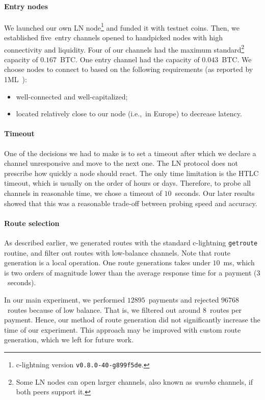 \paragraph{Entry nodes}
We launched our own LN node\footnote{c-lightning version \texttt{v0.8.0-40-g899f5de}.} and funded it with testnet coins.
Then, we established five~entry channels opened to handpicked nodes with high connectivity and liquidity.
Four of our channels had the maximum standard\footnote{Some LN nodes can open larger channels, also known as \textit{wumbo} channels, if both peers support it.} capacity of $0.167$~BTC.
One entry channel had the capacity of $0.043$~BTC.
We choose nodes to connect to based on the following requirements (as reported by 1ML~\cite{1MLTopConnected}):
\begin{itemize}
	\item well-connected and well-capitalized;
	\item located relatively close to our node (i.e.,~in Europe) to decrease latency.
\end{itemize}

\paragraph{Timeout}
One of the decisions we had to make is to set a timeout after which we declare a channel unresponsive and move to the next one.
The LN protocol does not prescribe how quickly a node should react.
The only time limitation is the HTLC timeout, which is usually on the order of hours or days.
Therefore, to probe all channels in reasonable time, we chose a timeout of $10$~seconds.
Our later results showed that this was a reasonable trade-off between probing speed and accuracy.

\paragraph{Route selection}
As described earlier, we generated routes with the standard c-lightning \texttt{getroute} routine, and filter out routes with low-balance channels.
Note that route generation is a local operation.
One route generations takes under $10$~ms, which is two orders of magnitude lower than the average response time for a payment ($3$~seconds).

In our main experiment, we performed $12895$~payments and rejected $96768$~routes because of low balance.
That is, we filtered out around $8$~routes per payment.
Hence, our method of route generation did not significantly increase the time of our experiment.
This approach may be improved with custom route generation, which we left for future work.

